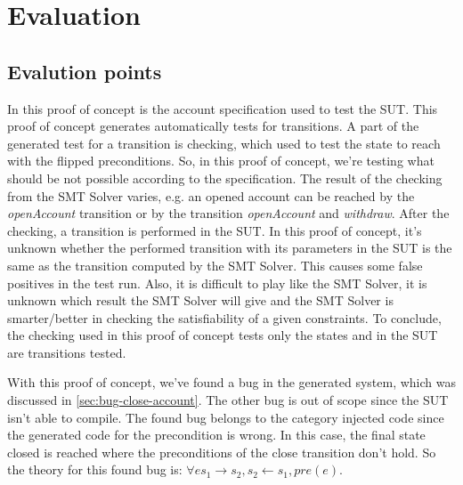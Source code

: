 \section{Evaluation}
\label{sec:ch4-evaluation}

\subsection{Evalution points}
In this proof of concept is the account specification used to test the SUT.
This proof of concept generates automatically tests for transitions. A part of
the generated test for a transition is checking, which used to test the state to
reach with the flipped preconditions. So, in this proof of concept, we're
testing what should be not possible according to the specification. The result
of the checking from the SMT Solver varies, e.g. an opened account can be
reached by the \textit{openAccount} transition or by the transition
\textit{openAccount} and \textit{withdraw}. After the checking, a transition
is performed in the SUT. In this proof of concept, it's unknown whether the
performed transition with its parameters in the SUT is the same as the
transition computed by the SMT Solver. This causes some false positives in the
test run. Also, it is difficult to play like the SMT Solver, it is unknown which
result the SMT Solver will give and the SMT Solver is smarter/better in checking
the satisfiability of a given constraints. To conclude, the checking used in
this proof of concept tests only the states and in the SUT are transitions
tested.

With this proof of concept, we've found a bug in the generated system, which was
discussed in \autoref{sec:bug-close-account}. The other bug is out of scope
since the SUT isn't able to compile. The found bug belongs to the category
injected code since the generated code for the precondition is wrong. In this
case, the final state closed is reached where the preconditions of the close
transition don't hold. So the theory for this found bug is:
$\forall e s_{1} \to s_{2}, s_{2} \gets s_{1}, pre(e)$.



